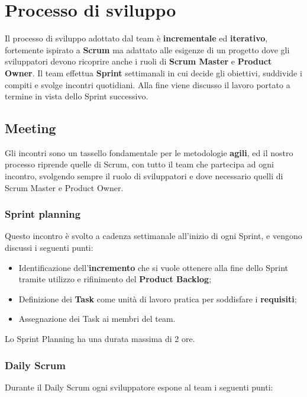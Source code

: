 \section{Processo di sviluppo}


Il processo di sviluppo adottato dal team è \textbf{incrementale} ed \textbf{iterativo}, fortemente ispirato a \textbf{Scrum} ma adattato alle esigenze di un progetto dove gli sviluppatori devono ricoprire anche i ruoli di \textbf{Scrum Master} e \textbf{Product Owner}.
%
Il team effettua \textbf{Sprint} settimanali in cui decide gli obiettivi, suddivide i compiti e svolge incontri quotidiani.
%
Alla fine viene discusso il lavoro portato a termine in vista dello Sprint successivo.

\subsection{Meeting}
Gli incontri sono un tassello fondamentale per le metodologie \textbf{agili}, ed il nostro processo riprende quelle di Scrum, con tutto il team che partecipa ad ogni incontro, svolgendo sempre il ruolo di sviluppatori e dove necessario quelli di Scrum Master e Product Owner.

\subsubsection{Sprint planning}
Questo incontro è svolto a cadenza settimanale all'inizio di ogni Sprint, e vengono discussi i seguenti punti:

\begin{itemize}
    \item Identificazione dell'\textbf{incremento} che si vuole ottenere alla fine dello Sprint tramite utilizzo e rifinimento del \textbf{Product Backlog};
    \item Definizione dei \textbf{Task} come unità di lavoro pratica per soddisfare i \textbf{requisiti};
    \item Assegnazione dei Task ai membri del team.
\end{itemize}

Lo Sprint Planning ha una durata massima di 2 ore.

\subsubsection{Daily Scrum}
Durante il Daily Scrum ogni sviluppatore espone al team i seguenti punti:

